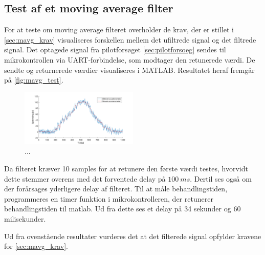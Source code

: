 \subsection{Test af et moving average filter}
For at teste om moving average filteret overholder de krav, der er stillet i \autoref{sec:mavg_krav} visualiseres forskellen mellem det ufiltrede signal og det filtrede signal. Det optagede signal fra pilotforsøget \autoref{sec:pilotforsoeg} sendes til mikrokontrollen via UART-forbindelse, som modtager den retunerede værdi. De sendte og returnerede værdier visualiseres i MATLAB. Resultatet heraf fremgår på \autoref{fig:mavg_test}. 

\begin{figure}[H]
	\centering
	\includegraphics[width=0.5\textwidth]{figures/accelerometer_filter}
	\caption{...}
	\label{fig:mavg_test}
\end{figure}


Da filteret kræver 10 samples for at retunere den første værdi testes, hvorvidt dette stemmer overens med det forventede delay på $100~ms$. Dertil ses også om der forårsages yderligere delay af filteret. Til at måle behandlingstiden, programmeres en timer funktion i mikrokontrolleren, der retunerer behandlingstiden til matlab. Ud fra dette ses et delay på 34 sekunder og 60 milisekunder.

Ud fra ovenstående resultater vurderes det at det filterede signal opfylder kravene for \autoref{sec:mavg_krav}. 